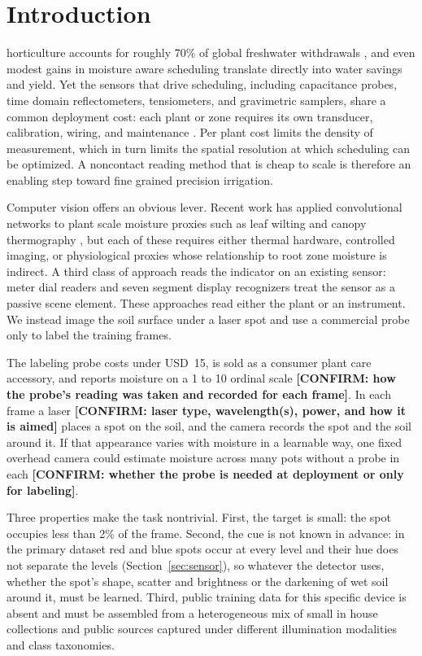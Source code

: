 ﻿\documentclass[journal]{IEEEtran}
\begin{document}
\section{Introduction}
 horticulture accounts for roughly 70\% of global freshwater withdrawals \cite{fao2020}, and even modest gains in moisture aware scheduling translate directly into water savings and yield. Yet the sensors that drive scheduling, including capacitance probes, time domain reflectometers, tensiometers, and gravimetric samplers, share a common deployment cost: each plant or zone requires its own transducer, calibration, wiring, and maintenance \cite{lekshmi2014,kashyap2021}. Per plant cost limits the density of measurement, which in turn limits the spatial resolution at which scheduling can be optimized. A noncontact reading method that is cheap to scale is therefore an enabling step toward fine grained precision irrigation.

Computer vision offers an obvious lever. Recent work has applied convolutional networks to plant scale moisture proxies such as leaf wilting \cite{kaneda2017} and canopy thermography \cite{garciatejero2018}, but each of these requires either thermal hardware, controlled imaging, or physiological proxies whose relationship to root zone moisture is indirect. A third class of approach reads the indicator on an existing sensor: meter dial readers \cite{liu2019} and seven segment display recognizers \cite{salomon2022} treat the sensor as a passive scene element. These approaches read either the plant or an instrument. We instead image the soil surface under a laser spot and use a commercial probe only to label the training frames.

The labeling probe costs under USD~15, is sold as a consumer plant care accessory, and reports moisture on a 1 to 10 ordinal scale \textbf{[CONFIRM: how the probe's reading was taken and recorded for each frame]}. In each frame a laser \textbf{[CONFIRM: laser type, wavelength(s), power, and how it is aimed]} places a spot on the soil, and the camera records the spot and the soil around it. If that appearance varies with moisture in a learnable way, one fixed overhead camera could estimate moisture across many pots without a probe in each \textbf{[CONFIRM: whether the probe is needed at deployment or only for labeling]}.

Three properties make the task nontrivial. First, the target is small: the spot occupies less than 2\% of the frame. Second, the cue is not known in advance: in the primary dataset red and blue spots occur at every level and their hue does not separate the levels (Section~\ref{sec:sensor}), so whatever the detector uses, whether the spot's shape, scatter and brightness or the darkening of wet soil around it, must be learned. Third, public training data for this specific device is absent and must be assembled from a heterogeneous mix of small in house collections and public sources captured under different illumination modalities and class taxonomies.
\end{document}
